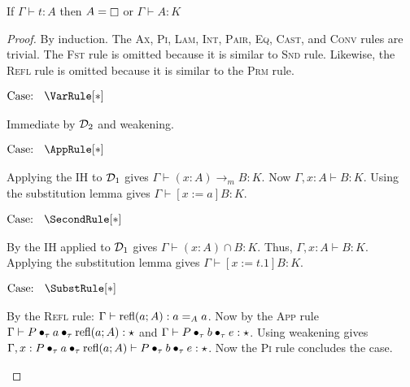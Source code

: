 \begin{lemma}
    \label{lem:2:classification}
    If $\Gamma \vdash t : A$ then $A = \kind$ or $\Gamma \vdash A : K$
\end{lemma}
\begin{proof}
    By induction.
    The \textsc{Ax}, \textsc{Pi}, \textsc{Lam}, \textsc{Int}, \textsc{Pair}, \textsc{Eq}, \textsc{Cast}, and \textsc{Conv} rules are trivial.
    The \textsc{Fst} rule is omitted because it is similar to \textsc{Snd} rule.
    Likewise, the \textsc{Refl} rule is omitted because it is similar to the \textsc{Prm} rule.

    $\text{Case: }\begin{array}{c} \VarRule[*] \end{array}$
    \begin{proofcase}
        Immediate by $\mathcal{D}_{2}$ and weakening.
    \end{proofcase}

    $\text{Case: }\begin{array}{c} \AppRule[*] \end{array}$
    \begin{proofcase}
        Applying the IH to $\mathcal{D}_{1}$ gives $\Gamma \vdash (x : A) \to_m B : K$.
        Now $\Gamma, x : A \vdash B : K$.
        Using the substitution lemma gives $\Gamma \vdash [x := a]B : K$.
    \end{proofcase}

    $\text{Case: }\begin{array}{c} \SecondRule[*] \end{array}$
    \begin{proofcase}
        By the IH applied to $\mathcal{D}_{1}$ gives $\Gamma \vdash (x : A )\cap B : K$.
        Thus, $\Gamma, x : A \vdash B : K$.
        Applying the substitution lemma gives $\Gamma \vdash [x := t.1]B : K$.
    \end{proofcase}

    $\text{Case: }\begin{array}{c} \SubstRule[*] \end{array}$
    \begin{proofcase}
        By the \textsc{Refl} rule: $\Gamma \vdash \textnormal{refl}(a;A) : a =_A a$.
        Now by the \textsc{App} rule $\Gamma \vdash P \bullet_{\tau} a \bullet_{\tau} \textnormal{refl}(a;A) : \star$ and $\Gamma \vdash P \bullet_{\tau} b \bullet_{\tau} e : \star$.
        Using weakening gives $\Gamma, x : P \bullet_{\tau} a \bullet_{\tau} \textnormal{refl}(a;A) \vdash P \bullet_{\tau} b \bullet_{\tau} e : \star$.
        Now the \textsc{Pi} rule concludes the case.
    \end{proofcase}


\end{proof}
